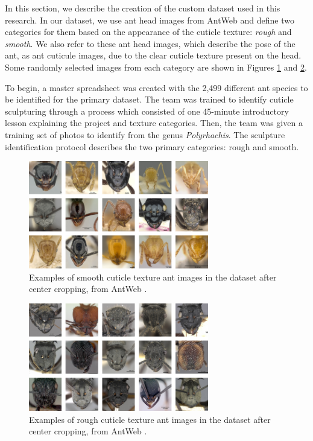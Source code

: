 \documentclass{aci}
\numberwithin{equation}{section}
\begin{document}
In this section, we describe the creation of the custom dataset used in this
research. In our dataset, we use ant head images from AntWeb
\cite{perrichot_antweb_2012} and define two categories for them based on the
appearance of the cuticle texture: \textit{rough} and \textit{smooth}. We also
refer to these ant head images, which describe the pose of the ant, as ant
cuticule images, due to the clear cuticle texture present on the head. Some
randomly selected images from each category are shown in Figures
\ref{fig:smooth-cuticle-texture} and \ref{fig:rough-cuticle-texture}.

To begin, a master spreadsheet was created with the 2,499 different ant species
to be identified for the primary dataset. The team was trained to identify
cuticle sculpturing through a process which consisted of one 45-minute
introductory lesson explaining the project and texture categories. Then, the
team was given a training set of photos to identify from the genus
\textit{Polyrhachis}. The sculpture identification protocol describes the two
primary categories: rough and smooth.

\begin{figure}
    \centering
    \includegraphics[width=0.7\textwidth]{assets/images/smooth_full_collage.png}
    \caption{Examples of smooth cuticle texture ant images in the dataset after
        center cropping, from AntWeb \cite{perrichot_antweb_2012}.}
    \label{fig:smooth-cuticle-texture}
\end{figure}

\begin{figure}
    \centering
    \includegraphics[width=0.7\textwidth]{assets/images/rough_full_collage.png}
    \caption{Examples of rough cuticle texture ant images in the dataset after
        center cropping, from AntWeb \cite{perrichot_antweb_2012}.}
    \label{fig:rough-cuticle-texture}
\end{figure}
\end{document}
